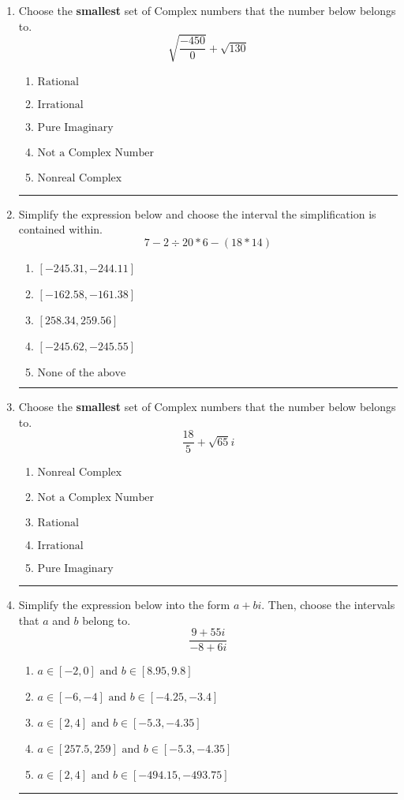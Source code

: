 \documentclass[14pt]{extbook}
\newcommand{\litem}[1]{\item#1\hspace*{-1cm}\rule{\textwidth}{0.4pt}}
\begin{document}
\begin{enumerate}
\litem{
Choose the \textbf{smallest} set of Complex numbers that the number below belongs to.\[ \sqrt{\frac{-450}{0}}+\sqrt{130} \]\begin{enumerate}[label=\Alph*.]
\item \( \text{Rational} \)
\item \( \text{Irrational} \)
\item \( \text{Pure Imaginary} \)
\item \( \text{Not a Complex Number} \)
\item \( \text{Nonreal Complex} \)

\end{enumerate} }
\litem{
Simplify the expression below and choose the interval the simplification is contained within.\[ 7 - 2 \div 20 * 6 - (18 * 14) \]\begin{enumerate}[label=\Alph*.]
\item \( [-245.31, -244.11] \)
\item \( [-162.58, -161.38] \)
\item \( [258.34, 259.56] \)
\item \( [-245.62, -245.55] \)
\item \( \text{None of the above} \)

\end{enumerate} }
\litem{
Choose the \textbf{smallest} set of Complex numbers that the number below belongs to.\[ \frac{18}{5}+\sqrt{65} i \]\begin{enumerate}[label=\Alph*.]
\item \( \text{Nonreal Complex} \)
\item \( \text{Not a Complex Number} \)
\item \( \text{Rational} \)
\item \( \text{Irrational} \)
\item \( \text{Pure Imaginary} \)

\end{enumerate} }
\litem{
Simplify the expression below into the form $a+bi$. Then, choose the intervals that $a$ and $b$ belong to.\[ \frac{9 + 55 i}{-8 + 6 i} \]\begin{enumerate}[label=\Alph*.]
\item \( a \in [-2, 0] \text{ and } b \in [8.95, 9.8] \)
\item \( a \in [-6, -4] \text{ and } b \in [-4.25, -3.4] \)
\item \( a \in [2, 4] \text{ and } b \in [-5.3, -4.35] \)
\item \( a \in [257.5, 259] \text{ and } b \in [-5.3, -4.35] \)
\item \( a \in [2, 4] \text{ and } b \in [-494.15, -493.75] \)


\end{enumerate}}
\end{enumerate}
\end{document}
